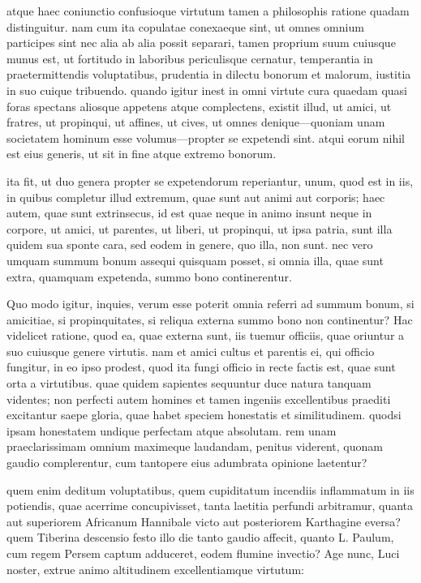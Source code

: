  atque haec coniunctio confusioque virtutum tamen a philosophis ratione quadam distinguitur. nam cum ita copulatae conexaeque sint, ut omnes omnium participes sint nec alia ab alia possit separari, tamen proprium suum cuiusque munus est, ut fortitudo in laboribus periculisque cernatur, temperantia in praetermittendis voluptatibus, prudentia in dilectu bonorum et malorum, iustitia in suo cuique tribuendo. quando igitur inest in omni virtute cura quaedam quasi foras spectans aliosque appetens atque complectens, existit illud, ut amici, ut fratres, ut propinqui, ut affines, ut cives, ut omnes denique—quoniam unam societatem hominum esse volumus—propter se expetendi sint. atqui eorum nihil est eius generis, ut sit in fine atque extremo bonorum.

 ita fit, ut duo genera propter se expetendorum reperiantur, unum, quod est in iis, in quibus completur illud extremum, quae sunt aut animi aut corporis; haec autem, quae sunt extrinsecus, id est quae neque in animo insunt neque in corpore, ut amici, ut parentes, ut liberi, ut propinqui, ut ipsa patria, sunt illa quidem sua sponte cara, sed eodem in genere, quo illa, non sunt. nec vero umquam summum bonum assequi quisquam posset, si omnia illa, quae sunt extra, quamquam expetenda, summo bono continerentur.

 Quo modo igitur, inquies, verum esse poterit omnia referri ad summum bonum, si amicitiae, si propinquitates, si reliqua externa summo bono non continentur? Hac videlicet ratione, quod ea, quae externa sunt, iis tuemur officiis, quae oriuntur a suo cuiusque genere virtutis. nam et amici cultus et parentis ei, qui officio fungitur, in eo ipso prodest, quod ita fungi officio in recte factis est, quae sunt orta a virtutibus. quae quidem sapientes sequuntur duce natura tanquam videntes; non perfecti autem homines et tamen ingeniis excellentibus praediti excitantur saepe gloria, quae habet speciem honestatis et similitudinem. quodsi ipsam honestatem undique perfectam atque absolutam. rem unam praeclarissimam omnium maximeque laudandam, penitus viderent, quonam gaudio complerentur, cum tantopere eius adumbrata opinione laetentur?

 quem enim deditum voluptatibus, quem cupiditatum incendiis inflammatum in iis potiendis, quae acerrime concupivisset, tanta laetitia perfundi arbitramur, quanta aut superiorem Africanum Hannibale victo aut posteriorem Karthagine eversa? quem Tiberina descensio festo illo die tanto gaudio affecit, quanto L. Paulum, cum regem Persem captum adduceret, eodem flumine invectio? Age nunc, Luci noster, extrue animo altitudinem excellentiamque virtutum:

